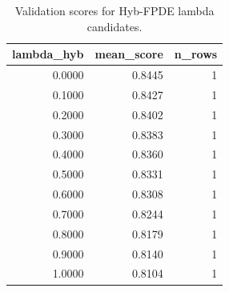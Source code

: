 \begin{table}[t]
\caption{Validation scores for Hyb-FPDE lambda candidates.}
\label{tab:lambda_distribution_computed}
\centering
\begin{tabular}{rrr}
\toprule
lambda\_hyb & mean\_score & n\_rows \\
\midrule
0.0000 & 0.8445 & 1 \\
0.1000 & 0.8427 & 1 \\
0.2000 & 0.8402 & 1 \\
0.3000 & 0.8383 & 1 \\
0.4000 & 0.8360 & 1 \\
0.5000 & 0.8331 & 1 \\
0.6000 & 0.8308 & 1 \\
0.7000 & 0.8244 & 1 \\
0.8000 & 0.8179 & 1 \\
0.9000 & 0.8140 & 1 \\
1.0000 & 0.8104 & 1 \\
\bottomrule
\end{tabular}

\end{table}
